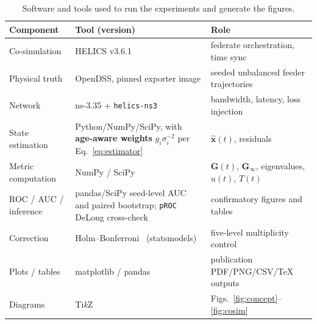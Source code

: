 \documentclass[journal]{IEEEtran}
\theoremstyle{plain}
\theoremstyle{definition}
\theoremstyle{remark}
\newcommand{\bxh}{\hat{\mathbf{x}}}
\newcommand{\bG}{\mathbf{G}}
\begin{document}
\begin{table}[!t]
\caption{Software and tools used to run the experiments and generate the
figures.}
\label{tab:tools}
\centering
\footnotesize
\renewcommand{\arraystretch}{1.2}
\begin{tabular}{@{}p{1.9cm} p{3.0cm} p{2.2cm}@{}}
\toprule
Component & Tool (version) & Role \\
\midrule
Co-simulation & HELICS v3.6.1~\cite{palmintier2017,hardy2024} & federate
orchestration, time sync \\
Physical truth & OpenDSS, pinned exporter image & seeded unbalanced feeder
trajectories \\
Network & ns-3.35 + \texttt{helics-ns3}~\cite{nsnam,helicsns3} &
bandwidth, latency, loss injection \\
State estimation & Python/NumPy/SciPy, with \textbf{age-aware weights}
$g_i\sigma_i^{-2}$ per Eq.~\eqref{eq:estimator} & $\bxh(t)$, residuals \\
Metric computation & NumPy / SciPy & $\bG(t)$, $\bG_{\infty}$,
eigenvalues, $u(t)$, $T(t)$ \\
ROC / AUC / inference & pandas/SciPy seed-level AUC and paired bootstrap;
\texttt{pROC} DeLong cross-check~\cite{robin2011,delong1988,sun2014} & confirmatory figures and tables \\
Correction & Holm--Bonferroni~\cite{holm1979} (statsmodels) &
five-level multiplicity control \\
Plots / tables & matplotlib / pandas & publication PDF/PNG/CSV/TeX outputs \\
Diagrams & Ti\emph{k}Z & Figs.~\ref{fig:concept}--\ref{fig:cosim} \\
\bottomrule
\end{tabular}
\end{table}
\end{document}
